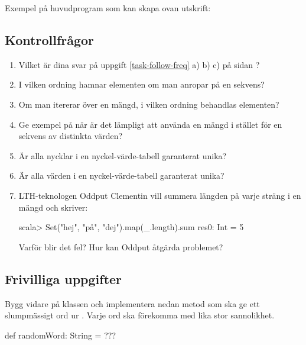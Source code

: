 \noindent Exempel på huvudprogram som kan skapa ovan utskrift:

\subsection{Kontrollfrågor}\label{words-check}

\begin{enumerate}

\item Vilket är dina svar på uppgift \ref{task-follow-freq} a) b) c) på sidan \pageref{task-follow-freq}?

\item I vilken ordning hamnar elementen om man anropar  på en sekvens?

\item Om man itererar över en mängd, i vilken ordning behandlas elementen?

\item Ge exempel på när är det lämpligt att använda en mängd i stället för en sekvens av distinkta värden?

\item Är alla nycklar i en nyckel-värde-tabell garanterat unika?

\item Är alla värden i en nyckel-värde-tabell garanterat unika?

\item LTH-teknologen Oddput Clementin vill summera längden på varje sträng i en mängd och skriver:
\begin{REPL}
scala> Set("hej", "på", "dej").map(_.length).sum
res0: Int = 5
\end{REPL}
Varför blir det fel? Hur kan Oddput åtgärda problemet?
\end{enumerate}

\subsection{Frivilliga uppgifter}

\Task Bygg vidare på klassen  och implementera nedan metod som ska ge ett slumpmässigt ord ur . Varje ord ska förekomma med lika stor sannolikhet.
\begin{Code}
def randomWord: String = ???
\end{Code}

